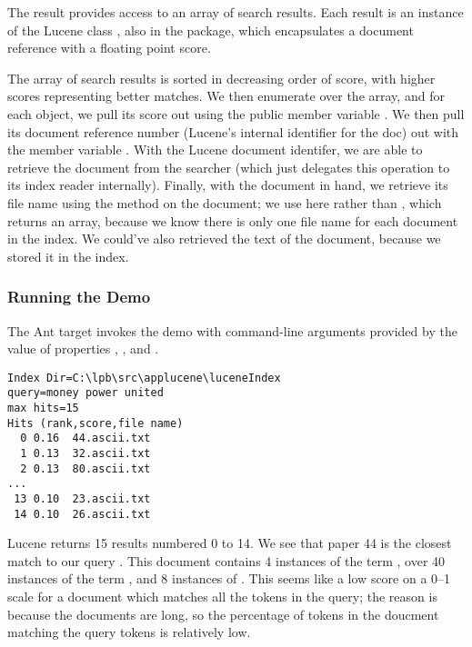 The  result provides access to an array of search
results.  Each result is an instance of the Lucene class
, also in the  package, which
encapsulates a document reference with a floating point score.

The array of search results is sorted in decreasing order of score,
with higher scores representing better matches.  We then enumerate
over the array, and for each  object, we pull its score
out using the public member variable .  We then pull its
document reference number (Lucene's internal identifier for the doc)
out with the member variable .  With the Lucene document
identifer, we are able to retrieve the document from the searcher
(which just delegates this operation to its index reader internally).
Finally, with the document in hand, we retrieve its file name using
the  method on the document; we use  here
rather than , which returns an array, because we
know there is only one file name for each document in the index.  We
could've also retrieved the text of the document, because we stored it
in the index.

\subsubsection{Running the Demo}

The Ant target  invokes the demo with command-line
arguments provided by the value of properties ,
, and .
%
\begin{verbatim}
Index Dir=C:\lpb\src\applucene\luceneIndex
query=money power united
max hits=15
Hits (rank,score,file name)
  0 0.16  44.ascii.txt
  1 0.13  32.ascii.txt
  2 0.13  80.ascii.txt
...
 13 0.10  23.ascii.txt
 14 0.10  26.ascii.txt
\end{verbatim}
%
Lucene returns 15 results numbered 0 to 14.  We see that paper 44 is
the closest match to our query .  This
document contains 4 instances of the term , over
40 instances of the term , and 8 instances of
.  This seems like a low score on a 0--1 scale
for a document which matches all the tokens in the query; the reason
is because the documents are long, so the percentage of tokens in
the doucment matching the query tokens is relatively low.

